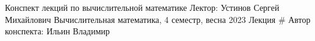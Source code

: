 \documentclass[a4paper,12pt]{article}
\begin{document}
    {Конспект лекций по вычислительной математике}%
    {Лектор: Устинов Сергей Михайлович}%
    {Вычислительная математика, 4 семестр, весна 2023}%
    {Лекция \#\thesec}%
    {Автор конспекта: Ильин Владимир}

    
\end{document}
